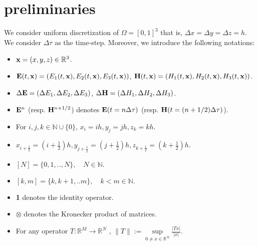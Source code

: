 \documentclass[12pt,reqno]{amsart}
\newcommand{\N}{\mathbb{N}}
\newcommand{\R}{\mathbb{R}}
\newcommand{\e}{{\bf E}}
\newcommand{\h}{{\bf H}}
\theoremstyle{definition}
\numberwithin{equation}{section}
\def\Gw{\Omega}     \def\Gx{\Xi}         \def\Gy{\Psi}
\begin{document}
	\section{preliminaries}
	We consider uniform discretization of $\Gw=[0,1]^3$ that is,
	 $\Delta x=\Delta y=\Delta z=h$.
	 We consider $\Delta \tau $ as the time-step.
	Moreover, we   introduce the following notations:
	\begin{itemize}
		\item ${\bf x}=(x,y,z)\in \R^3$.\\[1mm]
		\item $\e(t,{\bf x})=(E_1(t,{\bf x}),E_2(t,{\bf x}),E_3(t,{\bf x}))$, $\h(t,{\bf x})=(H_1(t,{\bf x}),H_2(t,{\bf x}),H_3(t,{\bf x}))$.\\[1mm]
		\item $\Delta \e=(\Delta E_1, \Delta E_2, \Delta E_3)$,   
		$\Delta \h=(\Delta H_1, \Delta  H_2, \Delta  H_3)$.
		\\[1mm]
		\item $\e^n$  (resp. $\h^{n+1/2}$) denotes $\e(t=n\Delta \tau)$ (resp. $\h(t=(n+1/2)\Delta \tau)$).\\[1mm]
		\item For $i,j,k\in \N \cup \{0\}$, $x_{i}=i h,y_{j}=j h,z_{k}=k h$. \\[1mm]
		\item $x_{i+\frac{1}{2}}=\left (i+\frac{1}{2}\right ) h, y_{j+\frac{1}{2}}=\left (j+\frac{1}{2}\right ) h, z_{k+\frac{1}{2}}=\left (k+\frac{1}{2}\right ) h$. \\[1mm]
		\item 	$[N]=\{0,1,..,N\},\quad N\in \N.$\\[1mm]
				\item 	$[k,m]=\{k,k+1,..m\},\quad k<m\in \N.$\\[1mm]
				\item {\bf 1} denotes the identity operator. \\[1mm]
				\item $\otimes$ denotes the Kronecker product of matrices.\\[1mm] 
				\item For any  operator  $T:\R^M\to \R^N$ , $\|T\|:=\sup\limits_{0\neq x\in \R^N}\frac{|Tx|}{|x|}$.
	\end{itemize}
\end{document}
